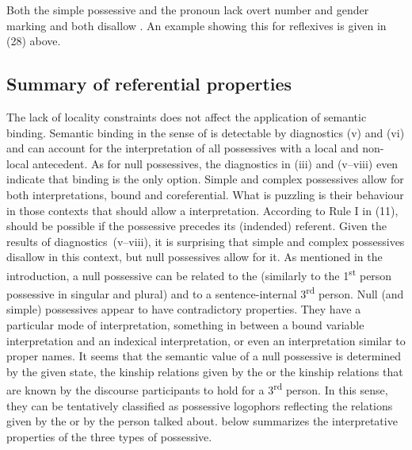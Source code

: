 \documentclass[output=paper]{langsci/langscibook}
\begin{document}
Both the simple possessive and the  pronoun lack overt number and gender marking and both disallow . An example showing this for reflexives is given in (28) above. 

\subsection{Summary of referential properties}%

The lack of locality constraints does not affect the application of semantic binding. Semantic binding in the sense of \citet{Reinhart2006} is detectable by diagnostics (v) and (vi) and can account for the interpretation of all possessives with a local and non-local antecedent. As for null possessives, the diagnostics in (iii) and (v--viii) even indicate that binding is the only option. Simple and complex possessives allow for both interpretations, bound and coreferential. What is puzzling is their behaviour in those contexts that should allow a  interpretation. According to Rule I in (11),  should be possible if the possessive precedes its (indended) referent. Given the results of diagnostics~(v--viii), it is surprising that simple and complex possessives disallow  in this context, but null possessives allow for it. As mentioned in the introduction, a null possessive can be related to the  (similarly to the 1\textsuperscript{st} person possessive in singular and plural) and to a sentence-internal 3\textsuperscript{rd} person. Null (and simple) possessives appear to have contradictory properties. They have a particular mode of interpretation, something in between a bound variable interpretation and an indexical interpretation, or even an interpretation similar to proper names. It seems that the semantic value of a null possessive is determined by the given state, the kinship relations given by the  or the kinship relations that are known by the discourse participants to hold for a 3\textsuperscript{rd} person. In this sense, they can be tentatively classified as possessive logophors reflecting the relations given by the  or by the person talked about.  below summarizes the interpretative properties of the three types of possessive.
\end{document}
